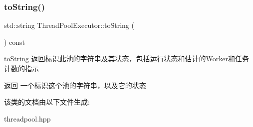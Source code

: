\subsubsection{\texorpdfstring{to\+String()}{toString()}}
{\footnotesize\ttfamily std\+::string Thread\+Pool\+Executor\+::to\+String (\begin{DoxyParamCaption}{ }\end{DoxyParamCaption}) const}



to\+String 返回标识此池的字符串及其状态，包括运行状态和估计的\+Worker和任务计数的指示 

\begin{DoxyReturn}{返回}
一个标识这个池的字符串，以及它的状态 
\end{DoxyReturn}


该类的文档由以下文件生成\+:\begin{DoxyCompactItemize}
\item 
threadpool.\+hpp\end{DoxyCompactItemize}
